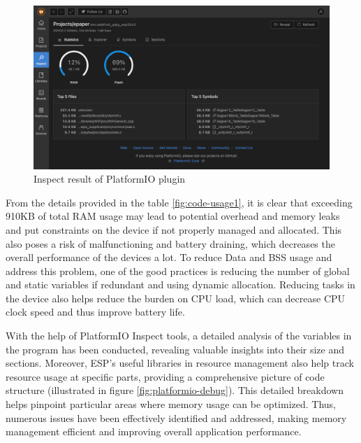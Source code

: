 \documentclass[../Main.tex]{subfiles}
\begin{document}
\begin{figure}[H]
    \centering
    \includegraphics[width=0.8\linewidth]{doc//imgs/platformio-inspect.png}
    \caption{Inspect result of PlatformIO plugin}
    \label{fig:inspect}
\end{figure}

From the details provided in the table \ref{fig:code-usage1}, it is clear that exceeding 910KB of total RAM usage may lead to potential overhead and memory leaks and put constraints on the device if not properly managed and allocated. This also poses a risk of malfunctioning and battery draining, which decreases the overall performance of the devices a lot. To reduce Data and BSS usage and address this problem, one of the good practices is reducing the number of global and static variables if redundant and using dynamic allocation. Reducing tasks in the device also helps reduce the burden on CPU load, which can decrease CPU clock speed and thus improve battery life.

With the help of PlatformIO Inspect tools, a detailed analysis of the variables in the program has been conducted, revealing valuable insights into their size and sections. Moreover, ESP's useful libraries in resource management also help track resource usage at specific parts, providing a comprehensive picture of code structure (illustrated in figure \ref{fig:platformio-debug}). This detailed breakdown helps pinpoint particular areas where memory usage can be optimized. Thus, numerous issues have been effectively identified and addressed, making memory management efficient and improving overall application performance.
\end{document}
